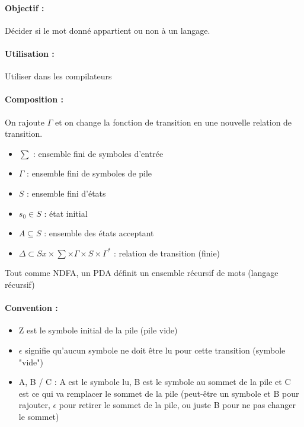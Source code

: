 \paragraph{Objectif :} Décider si le mot donné appartient ou non à un langage.

\paragraph{Utilisation :} Utiliser dans les compilateurs

\paragraph{Composition :}
On rajoute $\Gamma$ et on change la fonction de transition en une nouvelle 
relation de transition.
\begin{itemize}
	\item $\sum$ : ensemble fini de symboles d'entrée
	\item $\Gamma$ : ensemble fini de symboles de pile
	\item $S$ : ensemble fini d'états
	\item $s_0 \in S$ : état initial
	\item $A \subseteq S$ : ensemble des états acceptant
	\item $\Delta \subset Sx\times \sum \times \Gamma \times S \times 
		\Gamma^*$ : relation de transition (finie)
\end{itemize}

\begin{myprop}
	Tout comme NDFA, un PDA définit un ensemble récursif de mots (langage 
	récursif)
\end{myprop}

\paragraph{Convention :} 
\begin{itemize}
	\item Z est le symbole initial de la pile (pile vide)
	\item $\epsilon$ signifie qu’aucun symbole ne doit être lu pour cette 
		transition (symbole "vide")
	\item A, B / C : A est le symbole lu, B est le symbole au 
		sommet de la pile et C est ce qui va remplacer le 
		sommet de la pile (peut-être un symbole et B pour 
		rajouter, $\epsilon$ pour retirer le sommet de la pile, 
		ou juste B pour ne pas changer le sommet)
\end{itemize}

